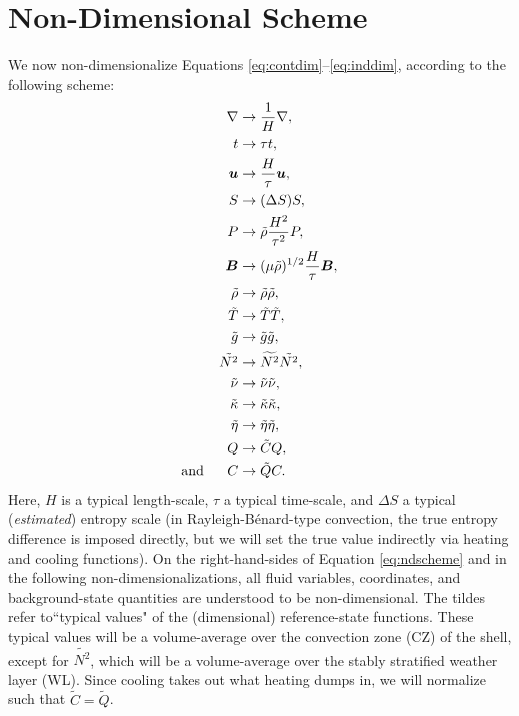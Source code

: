 \documentclass[12pt]{article}
\numberwithin{equation}{section}
\begin{document}
	\section{Non-Dimensional Scheme}
	We now non-dimensionalize Equations \eqref{eq:contdim}--\eqref{eq:inddim}, according to the following scheme:
	\begin{subequations}\label{eq:ndscheme}
	\begin{align}
		\nabla &\rightarrow \frac{1}{H}\nabla,\\
		t &\rightarrow \tau t,\\
		\bm{u} &\rightarrow \frac{H}{\tau} \bm{u},\\
		S &\rightarrow (\Delta S) S,\\
		P &\rightarrow \tilde{\rho} \frac{H^2}{\tau^2} P,\\
		\bm{B} &\rightarrow (\mu\tilde{\rho})^{1/2}\frac{H}{\tau} \bm{B},\\ 
		\tilde{\rho} &\rightarrow \tilde{\rho} \tilde{\rho}, \\
		\tilde{T} &\rightarrow \tilde{T} \tilde{T},\\
		\tilde{g} &\rightarrow \tilde{g} \tilde{g},\\
		\tilde{N^2} &\rightarrow \widetilde{N^2} \tilde{N^2},\\
		\tilde{\nu} &\rightarrow \tilde{\nu}\tilde{\nu},\\
		\tilde{\kappa} &\rightarrow \tilde{\kappa}\tilde{\kappa},\\
		 \tilde{\eta} &\rightarrow \tilde{\eta}\tilde{\eta},\\ 
		Q &\rightarrow \tilde{C} Q,\\
		\text{and}\ \ \ \ \  C &\rightarrow \tilde{Q} C.
	\end{align}
	\end{subequations}
	Here, $H$ is a typical length-scale, $\tau$ a typical time-scale, and $\Delta S$ a typical (\textit{estimated}) entropy scale (in Rayleigh-B\'enard-type convection, the true entropy difference is imposed directly, but we will set the true value indirectly via heating and cooling functions). On the right-hand-sides of Equation \eqref{eq:ndscheme} and in the following non-dimensionalizations, all fluid variables, coordinates, and background-state quantities are understood to be non-dimensional. The tildes refer to``typical values" of the (dimensional) reference-state functions. These typical values will be a volume-average over the convection zone (CZ) of the shell, except for $\widetilde{N^2}$, which will be a volume-average over the stably stratified weather layer (WL). Since cooling takes out what heating dumps in, we will normalize such that $\tilde{C}=\tilde{Q}$. 
	
\end{document}
